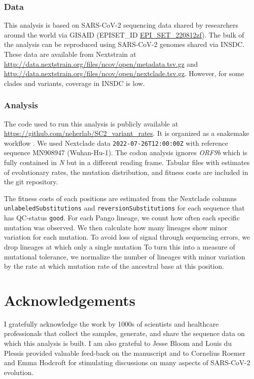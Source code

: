 \documentclass[aps,rmp, twocolumn]{revtex4}
\begin{document}
\subsubsection*{Data}
This analysis is based on SARS-CoV-2 sequencing data shared by researchers around the world via GISAID \citep{shu_gisaid_2017} (EPISET\_ID \href{10.55876/gis8.220812zf}{EPI_SET_220812zf}).
The bulk of the analysis can be reproduced using SARS-CoV-2 genomes shared via INSDC.
These data are available from Nextstrain at \url{http://data.nextstrain.org/files/ncov/open/metadata.tsv.gz} and \url{http://data.nextstrain.org/files/ncov/open/nextclade.tsv.gz}.
However, for some clades and variants, coverage in INSDC is low.

\subsubsection*{Analysis}
The code used to run this analysis is publicly available at \url{https://github.com/neherlab/SC2_variant_rates}.
It is organized as a snakemake workflow \citep{koster_snakemakescalable_2012}.
We used Nextclade data \texttt{2022-07-26T12:00:00Z} with reference sequence MN908947 (Wuhan-Hu-1).
The codon analysis ignores \emph{ORF9b} which is fully contained in \emph{N} but in a different reading frame.
Tabular files with estimates of evolutionary rates, the mutation distribution, and fitness costs are included in the git repository.

The fitness costs of each positions are estimated from the Nextclade columns \texttt{unlabeledSubstitutions} and \texttt{reversionSubstitutions} for each sequence that has QC-status \texttt{good}.
For each Pango lineage, we count how often each specific mutation was observed.
We then calculate how many lineages show minor variation for each mutation.
To avoid loss of signal through sequencing errors, we drop lineages at which only a single mutation
To turn this into a measure of mutational tolerance, we normalize the number of lineages with minor variation by the rate at which mutation rate of the ancestral base at this position.

\section*{Acknowledgements}
I gratefully acknowledge the work by 1000s of scientists and healthcare professionals that collect the samples, generate, and share the sequence data on which this analysis is built.
I am also grateful to Jesse Bloom and Louis du Plessis provided valuable feed-back on the manuscript and to Cornelius Roemer and Emma Hodcroft for stimulating discussions on many aspects of SARS-CoV-2 evolution.



\clearpage
\appendix

\clearpage
\onecolumngrid

% 
\end{document}
